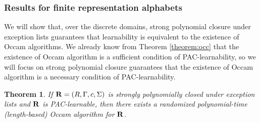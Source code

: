 \documentclass[12pt]{article}
\newtheorem{theorem}{Theorem}
\begin{document}
\subsubsection{Results for finite representation alphabets}

We will show that, over the discrete domains, strong polynomial closure under exception lists guarantees that learnability is equivalent to the existence of Occam algorithms. We already know from Theorem \ref{theorem:occ} that the existence of Occam algorithm is a sufficient condition of PAC-learnability, so we will focus on strong polynomial closure guarantees that the existence of Occam algorithm is a necessary condition of PAC-learnability.

\begin{theorem} \label {theorem:ex}
If ${\bf R} = (R, \Gamma, c, \Sigma)$ is strongly polynomially closed under exception lists and ${\bf R}$ is PAC-learnable, then there exists a randomized polynomial-time (length-based) Occam algorithm for ${\bf R}$.
\end{theorem}
\end{document}
